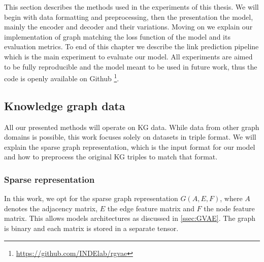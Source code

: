 This section describes the methods used in the experiments of this thesis. We will begin with data formatting and preprocessing, then the presentation the model, mainly the encoder and decoder and their variations. Moving on we explain our implementation of graph matching the loss function of the model and its evaluation metrics. To end of this chapter we describe the link prediction pipeline which is the main experiment to evaluate our model. All experiments are aimed to be fully reproducible and the model meant to be used in future work, thus the code is openly available on Github \footnote{\url{https://github.com/INDElab/rgvae}}.

\subsection{Knowledge graph data}
All our presented methods will operate on KG data. While data from other graph domains is possible, this work focuses solely on datasets in triple format. We will explain the sparse graph representation, which is the input format for our model and how to preprocess the original KG triples to match that format.

\subsubsection{Sparse representation}


In this work, we opt for the sparse graph representation $G(A,E,F)$, where $A$ denotes the adjacency matrix, $E$ the edge feature matrix and $F$ the node feature matrix. This allows models architectures as discussed in \ref{ssec:GVAE}. The graph is binary and each matrix is stored in a separate tensor.


